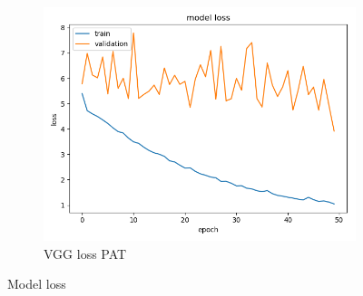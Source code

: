 \begin{figure}
\begin{subfigure}[b]{.3\linewidth}
\includegraphics[width=\linewidth]{Figs/resnet_pat_loss.jpg}
\caption{VGG loss PAT}\label{fig:tiger}
\end{subfigure}
\caption{Model loss}
\label{fig:loss}
\end{figure}


